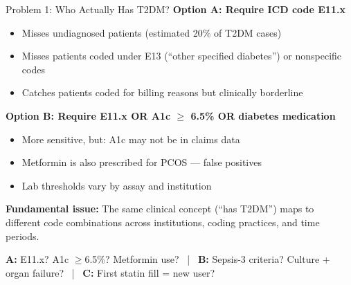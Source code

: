 \documentclass[aspectratio=169,10pt]{beamer}
\begin{document}
\begin{frame}{Problem 1: Who Actually Has T2DM?}
\textbf{Option A: Require ICD code E11.x}
\begin{itemize}
    \item Misses undiagnosed patients (estimated 20\% of T2DM cases)
    \item Misses patients coded under E13 (``other specified diabetes'') or nonspecific codes
    \item Catches patients coded for billing reasons but clinically borderline
\end{itemize}

\vspace{0.5em}
\pause
\vspace{0.5em}
\textbf{Option B: Require E11.x OR A1c $\geq$ 6.5\% OR diabetes medication}
\begin{itemize}
    \item More sensitive, but: A1c may not be in claims data
    \item Metformin is also prescribed for PCOS --- false positives
    \item Lab thresholds vary by assay and institution
\end{itemize}

\vspace{0.8em}
\begin{center}
\colorbox{warnbg}{\parbox{0.85\textwidth}{\centering
\textbf{Fundamental issue:} The same clinical concept (``has T2DM'') maps to\\
different code combinations across institutions, coding practices, and time periods.
}}
\end{center}

\begin{center}\tiny
\textbf{\color{columbia}A:} E11.x? A1c $\geq$6.5\%? Metformin use? ~|~ \textbf{\color{columbiaaccent}B:} Sepsis-3 criteria? Culture + organ failure? ~|~ \textbf{\color{columbiagray}C:} First statin fill = new user?
\end{center}
\end{frame}
\end{document}
